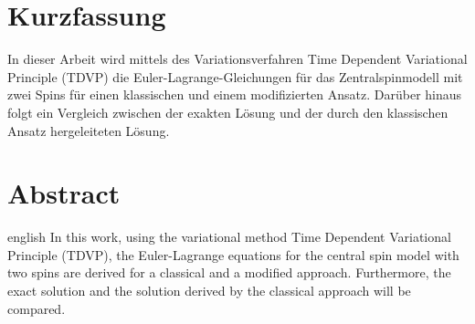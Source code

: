 \thispagestyle{plain}

\section*{Kurzfassung}
In dieser Arbeit wird mittels des Variationsverfahren \glqq Time Dependent Variational Principle\grqq{} (TDVP) die Euler-Lagrange-Gleichungen für 
das Zentralspinmodell mit zwei Spins für einen klassischen und einem modifizierten Ansatz. Darüber hinaus folgt ein Vergleich zwischen der exakten Lösung
und der durch den klassischen Ansatz hergeleiteten Lösung.

\section*{Abstract}
\begin{foreignlanguage}{english}
In this work, using the variational method \glqq Time Dependent Variational Principle\grqq{} (TDVP), the Euler-Lagrange equations for the 
central spin model with two spins are derived for a classical and a modified approach. Furthermore, the exact solution
and the solution derived by the classical approach will be compared.
\end{foreignlanguage}
